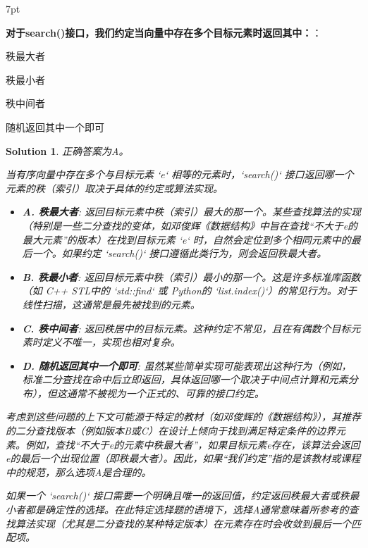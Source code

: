 \documentclass[UTF8]{report}
\newtheorem{solution}{Solution}
\theoremstyle{MyLineTheoremStyle} %
\theoremstyle{MyBlockTheoremStyle} %
\theoremstyle{MySubsubsectionStyle} %
\newenvironment{graybox}{%
        \def\FrameCommand{%
        \hspace{1pt}%
        {\color{gray}\small \vrule width 2pt}%
        {\color{graybox_color}\vrule width 4pt}%
        \colorbox{graybox_color}%
        }%
        \MakeFramed{\advance\hsize-\width\FrameRestore}%
        \noindent\hspace{-4.55pt}%
        \begin{adjustwidth}{}{7pt}%
        \vspace{2pt}\vspace{2pt}%
        }
        {%
        \vspace{2pt}\end{adjustwidth}\endMakeFramed%
        }
\begin{document}
\begin{graybox}
\textbf{对于search()接口，我们约定当向量中存在多个目标元素时返回其中：}：
\begin{circledenum}
    \item 秩最大者
    \item 秩最小者
    \item 秩中间者
    \item 随机返回其中一个即可
\end{circledenum}
\end{graybox}

\begin{solution}
正确答案为A。

当有序向量中存在多个与目标元素 `e` 相等的元素时，`search()` 接口返回哪一个元素的秩（索引）取决于具体的约定或算法实现。

\begin{itemize}
    \item \textbf{A. 秩最大者}: 返回目标元素中秩（索引）最大的那一个。某些查找算法的实现（特别是一些二分查找的变体，如邓俊辉《数据结构》中旨在查找“不大于e的最大元素”的版本）在找到目标元素 `e` 时，自然会定位到多个相同元素中的最后一个。如果约定 `search()` 接口遵循此类行为，则会返回秩最大者。

    \item \textbf{B. 秩最小者}: 返回目标元素中秩（索引）最小的那一个。这是许多标准库函数（如 C++ STL中的 `std::find` 或 Python的 `list.index()`）的常见行为。对于线性扫描，这通常是最先被找到的元素。

    \item \textbf{C. 秩中间者}: 返回秩居中的目标元素。这种约定不常见，且在有偶数个目标元素时定义不唯一，实现也相对复杂。

    \item \textbf{D. 随机返回其中一个即可}: 虽然某些简单实现可能表现出这种行为（例如，标准二分查找在命中后立即返回，具体返回哪一个取决于中间点计算和元素分布），但这通常不被视为一个正式的、可靠的接口约定。
\end{itemize}

考虑到这些问题的上下文可能源于特定的教材（如邓俊辉的《数据结构》），其推荐的二分查找版本（例如版本B或C）在设计上倾向于找到满足特定条件的边界元素。例如，查找“不大于e的元素中秩最大者”，如果目标元素e存在，该算法会返回e的最后一个出现位置（即秩最大者）。因此，如果“我们约定”指的是该教材或课程中的规范，那么选项A是合理的。

如果一个 `search()` 接口需要一个明确且唯一的返回值，约定返回秩最大者或秩最小者都是确定性的选择。在此特定选择题的语境下，选择A通常意味着所参考的查找算法实现（尤其是二分查找的某种特定版本）在元素存在时会收敛到最后一个匹配项。
\end{solution}
\end{document}
